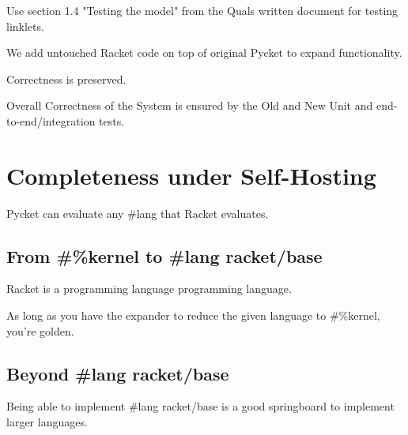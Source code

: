 			\begin{todo}[Import]
				Use section 1.4 "Testing the model" from the Quals written document for testing linklets.
			\end{todo}

		\begin{paragraph-here}
			We add untouched Racket code on top of original Pycket to expand functionality.

				Correctness is preserved.
		\end{paragraph-here}

		\begin{paragraph-here}
			Overall Correctness of the System is ensured by the Old and New Unit and end-to-end/integration tests.
		\end{paragraph-here}

	\section[\texorpdfstring{Completeness under Self-Hosting}{Completeness}]{Completeness under Self-Hosting}

		\begin{mainpoint}
			Pycket can evaluate any \#lang that Racket evaluates.
		\end{mainpoint}

		\subsection{From \#\%kernel to \#lang racket/base}
			\begin{mainpoint}
				Racket is a programming language programming language.

				As long as you have the expander to reduce the given language to \#\%kernel, you're golden.
			\end{mainpoint}

		\subsection{Beyond \#lang racket/base}
			\begin{mainpoint}
				Being able to implement \#lang racket/base is a good springboard to implement larger languages.
			\end{mainpoint}